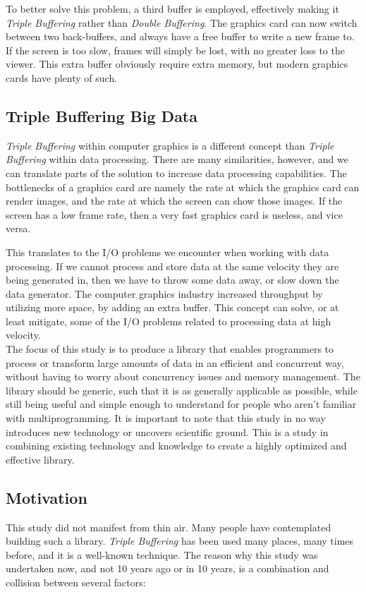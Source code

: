 \documentclass[a4paper]{article}
\begin{document}
To better solve this problem, a third buffer is employed, effectively making it \textit{Triple Buffering} rather than \textit{Double Buffering}. The graphics card can now switch between two back-buffers, and always have a free buffer to write a new frame to. If the screen is too slow, frames will simply be lost, with no greater loss to the viewer. This extra buffer obviously require extra memory, but modern graphics cards have plenty of such.\\


\subsection{Triple Buffering Big Data}
\textit{Triple Buffering} within computer graphics is a different concept than \textit{Triple Buffering} within data processing. There are many similarities, however, and we can translate parts of the solution to increase data processing capabilities. The bottlenecks of a graphics card are namely the rate at which the graphics card can render images, and the rate at which the screen can show those images. If the screen has a low frame rate, then a very fast graphics card is useless, and vice versa. 

This translates to the I/O problems we encounter when working with data processing. If we cannot process and store data at the same velocity they are being generated in, then we have to throw some data away, or slow down the data generator. The computer graphics industry increased throughput by utilizing more space, by adding an extra buffer. This concept can solve, or at least mitigate, some of the I/O problems related to processing data at high velocity.\\

The focus of this study is to produce a library that enables programmers to process or transform large amounts of data in an efficient and concurrent way, without having to worry about concurrency issues and memory management. The library should be generic, such that it is as generally applicable as possible, while still being useful and simple enough to understand for people who aren't familiar with multiprogramming. It is important to note that this study in no way introduces new technology or uncovers scientific ground. This is a study in combining existing technology and knowledge to create a highly optimized and effective library.


\subsection{Motivation}
This study did not manifest from thin air. Many people have contemplated building such a library. \textit{Triple Buffering} has been used many places, many times before, and it is a well-known technique. The reason why this study was undertaken now, and not 10 years ago or in 10 years, is a combination and collision between several factors:
\end{document}
